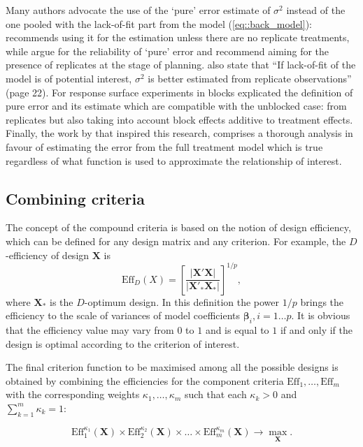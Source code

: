 \documentclass[11pt]{article}
\begin{document}
Many authors advocate the use of the `pure' error estimate of $\sigma^2$ instead of the one pooled with the lack-of-fit part from the model (\ref{eq::back_model}): \cite{Cox1958planning} recommends using it for the estimation unless there are no replicate treatments, while \cite{Draper1998} argue for the reliability of `pure' error and recommend aiming for the presence of replicates at the stage of planning. \cite{Atkinson2007} also state that ``If lack-of-fit of the model is of potential interest, $\sigma^{2}$ is better estimated from replicate observations'' (page 22). For response surface experiments in blocks \cite{Gilmour2000PErsm} explicated the definition of pure error and its estimate which are compatible with the unblocked case: from replicates but also taking into account  block effects additive to treatment effects. Finally, the work by \cite{GilmourTrinca2012} that inspired this research, comprises a thorough analysis in favour of estimating the error from the full treatment model which is true regardless of what function is used to approximate the relationship of interest.


\subsection{Combining criteria}

The concept of the compound criteria is based on the notion of design efficiency, which can be defined for any design matrix and any criterion. For example, the $D$-efficiency of design $\bm{X}$ is
\begin{equation}
\label{eq::D_eff}
\mbox{Eff}_{D}(X)=\left[\frac{\vert \bm{X}'\bm{X}\vert}{\vert \bm{X}'_{*}\bm{X}_{*}\vert}\right]^{1/p},
\end{equation}   
where $\bm{X}_{*}$ is the $D$-optimum design. In this definition the power $1/p$ brings the efficiency to the scale of variances of model coefficients $\bm{\beta}_{i}, i=1\ldots p.$ It is obvious that the efficiency value may vary from $0$ to $1$ and is equal to $1$ if and only if the design is optimal according to the criterion of interest.

The final criterion function to be maximised among all the possible designs is obtained by combining the efficiencies for the component criteria $\mbox{Eff}_{1},\ldots, \mbox{Eff}_{m}$ with the corresponding weights $\kappa_{1},\ldots ,\kappa_{m}$ such that each $\kappa_{k}>0$ and $\sum_{k=1}^{m}\kappa_{k}=1:$

\begin{equation}
\label{eq::compound}
\mbox{Eff}^{\kappa_{1}}_{1}(\bm{X})\times\mbox{Eff}^{\kappa_{2}}_{2}(\bm{X})\times\ldots\times\mbox{Eff}^{\kappa_{m}}_{m}(\bm{X})\rightarrow \underset{\bm{X}}\max.
\end{equation}
\end{document}
